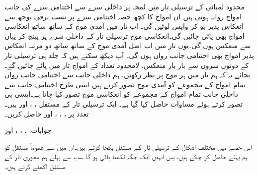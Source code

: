 محدود لمبائی کے ترسیلی تار میں لمحہ  پر داخلی سرے سے اختتامی سرے کی جانب  امواج روانہ ہوتی ہیں۔ان امواج کا کچھ حصہ اختتامی سرے پر نسب برقی بوجھ سے انعکاس پذیر ہو کر واپس لوٹیں گی۔ اب تار میں آمدی موج کے ساتھ ساتھ انعکاسی امواج بھی پائی جائیں گی۔انعکاسی موج ترسیلی تار کے داخلی سرے پر پہنچ کر یہاں سے منعکس ہوں گی۔یوں تار میں اب اصل آمدی موج کے ساتھ ساتھ دو مرتبہ انعکاس پذیر امواج بھی اختتامی جانب رواں ہوں گی۔ آپ دیکھ سکتے ہیں کہ جلد ہی ترسیلی تار کے دونوں سروں سے بار بار منعکس، لامحدود تعداد کے امواج تار میں پائے جائیں گے۔بجائے یہ کہ ہم تار میں ہر موج پر نظر رکھیں، ہم داخلی جانب سے اختتامی جانب رواں تمام امواج کے مجموعے کو آمدی موج تصور کرتے ہیں۔اسی طرح اختتامی جانب سے داخلی جانب تمام امواج کے مجموعے کو انعکاسی موج تصور کیا جاتا ہے۔ایسی ہی تصور کرتے ہوئے  مساوات  حاصل کیا گیا ہے۔  
ایک ترسیلی تار  کے مستقل ، ،  اور  ہیں۔ تعدد  پر ، ، ،  اور  حاصل کریں۔

جوابات: ، ، ،  اور 

اس حصے میں مختلف اشکال کے ترسیلی تار کے مستقل یکجا کرتے ہیں۔ان میں سے عموماً مستقل کو ہم پہلے حاصل کر چکے ہیں، بس انہیں ایک جگہ لکھنا باقی ہو گا۔سب سے پہلے ہم محوری تار کے مستقل اکھٹے کرتے ہیں۔

